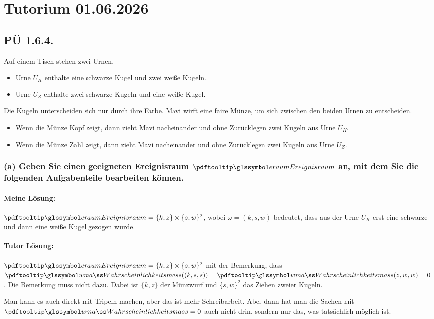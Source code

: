 
\section{Tutorium 01.06.2026}\label{ch:tutorium-01.06.2026}
\subsection{PÜ 1.6.4. \abhaken}\label{sec:pu-1.6.4.} \color{black}
Auf einem Tisch stehen zwei Urnen. 
\begin{itemize}
    \item Urne $U_K$ enthalte eine schwarze Kugel und zwei weiße Kugeln.
    \item Urne $U_Z$ enthalte zwei schwarze Kugeln und eine weiße Kugel.
\end{itemize}
Die Kugeln unterscheiden sich nur durch ihre Farbe.
Mavi wirft eine faire Münze, um sich zwischen den beiden Urnen zu entscheiden.
\begin{itemize}
    \item Wenn die Münze Kopf zeigt, dann zieht Mavi nacheinander und ohne Zurücklegen zwei
    Kugeln aus Urne $U_K$.
    \item Wenn die Münze Zahl zeigt, dann zieht Mavi nacheinander und ohne Zurücklegen zwei
    Kugeln aus Urne $U_Z$.
\end{itemize}

\begin{auf}
    \subsubsection*{(a) Geben Sie einen geeigneten Ereignisraum $\eraum$ an, mit dem Sie die folgenden Aufgabenteile
    bearbeiten können.}
    \paragraph{Meine Lösung:} $\eraum = \{k,z\} \times \{s, w\}^2 $, wobei $\omega = (k, s, w)$ bedeutet, dass aus
    der Urne $U_K$ erst eine schwarze und dann eine weiße Kugel gezogen wurde.
    \paragraph{Tutor Lösung:} $\eraum = \{k,z\} \times \{s, w\}^2$ mit der Bemerkung, dass $\pe((k,s,s)) = \pe(z,w,w) = 0$.
    Die Bemerkung muss nicht dazu.
    Dabei ist $\{k,z\}$ der Münzwurf und $\{s, w\}^2$ das Ziehen zweier Kugeln.

    Man kann es auch direkt mit Tripeln machen, aber das ist mehr Schreibarbeit.
    Aber dann hat man die Sachen mit $\pe = 0$ auch nicht drin, sondern nur das, was tatsächlich möglich ist.
\end{auf}

